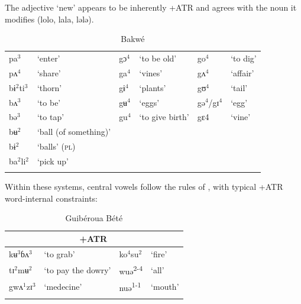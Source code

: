 \documentclass[output=paper
,newtxmath
,modfonts
,nonflat]{langsci/langscibook}
\begin{document}
The adjective ‘new’ appears to be inherently +ATR and agrees with the noun it modifies (lolo, lala, lələ).

\begin{table}
\caption{Bakwé \citep{centredetraduction2006}}
\label{tab:zogbo:7}
\begin{tabular}{llllll}
\lsptoprule
  pa$^3$ &   ‘enter’  &  gɔ$^4$    & ‘to be old’ &  go$^4$ &    ‘to dig’\\

  pʌ$^4$  &   ‘share’    & ga$^4$ &   ‘vines’     & gʌ$^4$ &    ‘affair’\\

  bɨ$^2$ti$^3$ & ‘thorn’ &    gɨ$^4$ &   ‘plants’  & gʊ$^4$ &    ‘tail’\\

  bʌ$^3$ & ‘to be’ &    gʉ$^4$ &   ‘eggs’  &   gə$^4$/gɪ$^4$ & ‘egg’\\

  bə$^3$ & ‘to tap’ &    gu$^4$   & ‘to give birth’ &  gɛ4  &   ‘vine’\\

  bʉ$^2$ & ‘ball (of something)’\\

  bɨ$^2$ & ‘balls’ (\textsc{pl})\\

  ba$^2$li$^2$ & ‘pick up’\\
\lspbottomrule
\end{tabular}
\end{table}

Within these systems, central vowels follow the rules of , with typical +ATR word-internal constraints:   

\begin{table}
\caption{ Guibéroua Bété \citep{Werle1976}}
\label{tab:zogbo:8}
\begin{tabular}{llll}
\lsptoprule
\multicolumn{2}{c}{–ATR} & \multicolumn{2}{c}{+ATR}\\
\midrule
kʉ$^3$ɓʌ$^3$ &  ‘to grab’ &      ko$^4$su$^2$ &   ‘fire’\\

tɪ$^2$mʉ$^2$ & ‘to pay the dowry’  &  wuə\textsuperscript{2-4} & ‘all’\\

gwʌ$^1$zɪ$^3$ &  ‘medecine’      & nuə\textsuperscript{1-1}  &   ‘mouth’\\
\lspbottomrule
\end{tabular}
\end{table}
\end{document}
